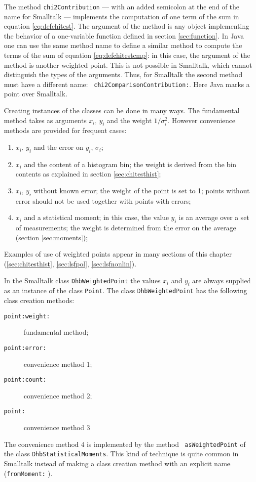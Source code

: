 \documentclass[twoside]{book}
\begin{document}
The method {\tt chi2Contribution} --- with an added semicolon at
the end of the name for Smalltalk --- implements the computation
of one term of the sum in equation \ref{eq:defchitest}. The
argument of the method is any object implementing the behavior of
a one-variable function defined in section \ref{sec:function}. In
Java one can use the same method name to define a similar method
to compute the terms of the sum of equation
\ref{eq:defchitestcmp}: in this case, the argument of the method
is another weighted point. This is not possible in Smalltalk,
which cannot distinguish the types of the arguments. Thus, for
Smalltalk the second method must have a different name: {\tt
chi2ComparisonContribution:}. Here Java marks a point over
Smalltalk.

Creating instances of the classes can be done in many ways. The
fundamental method takes as arguments $x_i$, $y_i$ and the weight
$1/\sigma_i^2$. However convenience methods are provided for
frequent cases:
\begin{enumerate}
  \item $x_i$, $y_i$ and the error on $y_i$, $\sigma_i$;
  \item $x_i$ and the content of a histogram bin; the weight is derived
  from the bin contents as explained in section \ref{sec:chitesthist};
  \item $x_i$, $y_i$ without known error; the weight of the point is set to
  1; points without error should not be used together with points
  with errors;
  \item $x_i$ and a statistical moment; in this case, the value $y_i$
  is an average over a set of measurements; the weight is determined
  from the error on the average (\cf section \ref{sec:moments});
\end{enumerate}
Examples of use of weighted points appear in many sections of this
chapter (\ref{sec:chitesthist}, \ref{sec:lsfpol},
\ref{sec:lsfnonlin}).

In the Smalltalk class {\tt DhbWeightedPoint} the values $x_i$ and
$y_i$ are always supplied as an instance of the class {\tt Point}.
The class {\tt DhbWeightedPoint} has the following class creation
methods:
\begin{description}
  \item[\tt point:weight:] fundamental method;
  \item[\tt point:error:] convenience method 1;
  \item[\tt point:count:] convenience method 2;
  \item[\tt point:] convenience method 3
\end{description}
The convenience method 4 is implemented by the method {\tt
asWeightedPoint} of the class {\tt DhbStatisticalMoments}. This
kind of technique is quite common in Smalltalk instead of making a
class creation method with an explicit name ({\tt fromMoment:}
\eg).
\end{document}
